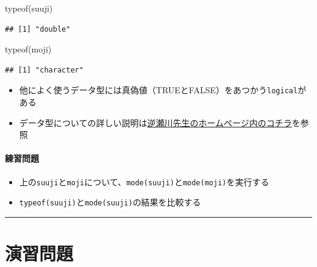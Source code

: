 \documentclass[
]{book}
\newenvironment{Shaded}{\begin{snugshade}}{\end{snugshade}}
\newcommand{\FunctionTok}[1]{\textcolor[rgb]{0.00,0.00,0.00}{#1}}
\newcommand{\NormalTok}[1]{#1}
\providecommand{\tightlist}{%
  \setlength{\itemsep}{0pt}\setlength{\parskip}{0pt}}
\begin{document}
\begin{Shaded}
\begin{Highlighting}[]
\FunctionTok{typeof}\NormalTok{(suuji)}
\end{Highlighting}
\end{Shaded}

\begin{verbatim}
## [1] "double"
\end{verbatim}

\begin{Shaded}
\begin{Highlighting}[]
\FunctionTok{typeof}\NormalTok{(moji)}
\end{Highlighting}
\end{Shaded}

\begin{verbatim}
## [1] "character"
\end{verbatim}

\begin{itemize}
\tightlist
\item
  他によく使うデータ型には真偽値（TRUEとFALSE）をあつかう\texttt{logical}がある
\item
  データ型についての詳しい説明は\href{http://www.f.waseda.jp/sakas/R/Rdata.html}{逆瀬川先生のホームページ内のコチラ}を参照
\end{itemize}

\hypertarget{ux7df4ux7fd2ux554fux984c-1}{%
\paragraph*{練習問題}\label{ux7df4ux7fd2ux554fux984c-1}}

\begin{itemize}
\tightlist
\item
  上の\texttt{suuji}と\texttt{moji}について、\texttt{mode(suuji)}と\texttt{mode(moji)}を実行する
\item
  \texttt{typeof(suuji)}と\texttt{mode(suuji)}の結果を比較する
\end{itemize}

\begin{center}\rule{0.5\linewidth}{0.5pt}\end{center}

\hypertarget{ux6f14ux7fd2ux554fux984c-1}{%
\section{演習問題}\label{ux6f14ux7fd2ux554fux984c-1}}
\end{document}
